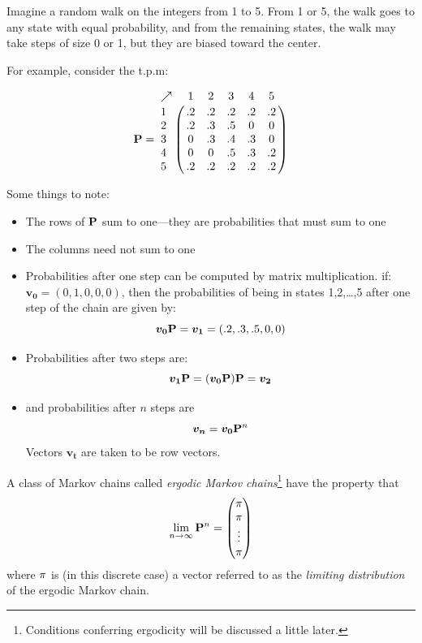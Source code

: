 
Imagine a random walk on the integers from 1 to 5.  From 1 or 5, the walk goes to any state with equal probability, and from the remaining states, the walk may take steps of size 0 or 1, but they are biased toward the center.  

For example, consider the t.p.m:

\[
	\mP = \bordermatrix{
	\nearrow & 1 & 2 & 3 & 4 & 5 \cr
	1 & .2 & .2 & .2 & .2 & .2 \cr 
	2 & .2 & .3 & .5 & 0 & 0 \cr 
	3 & 0 & .3 & .4 & .3 & 0 \cr 
	4 & 0 & 0 & .5 & .3 & .2 \cr 
	5 & .2 & .2 & .2 & .2 & .2
	}
\] 

\newpage
Some things to note:
\begin{itemize}
\item The rows of $\mathbf{P}$ sum to one---they are probabilities that must sum to one
\item The columns need not sum to one
\item Probabilities after one step can be computed by matrix multiplication.  \ie{} if:
$\bm{v_0} = (0,1,0,0,0)$, then the probabilities of being in states 1,2,\ldots,5 after one step of the chain are given by:
\[
\bm{v_0}\mP = \bm{v_1} = (.2,.3,.5,0,0)
\] 
\item Probabilities after two steps are:
\[
	\bm{v_1}\mP = (\bm{v_0}\mP)\mP = \bm{v_2}
\]
\item and probabilities after $n$ steps are
\[
\bm{v_n} = \bm{v_0}\mP^n
\]
Vectors $\bm{v_t}$ are taken to be row vectors.
\end{itemize}

A class of Markov chains called {\em ergodic Markov chains}\footnote{Conditions conferring ergodicity will be discussed a little later.} have the property that 
\[
	\lim_{n\rightarrow\infty} \mathbf{P}^n = \left(\begin{matrix}
	{\pi} \\
	{\pi} \\
	\vdots \\
	{\pi}
\end{matrix}
\right)
\]
where ${\pi}$ is (in this discrete case) a vector referred to as the {\em limiting distribution} of the ergodic Markov chain.

